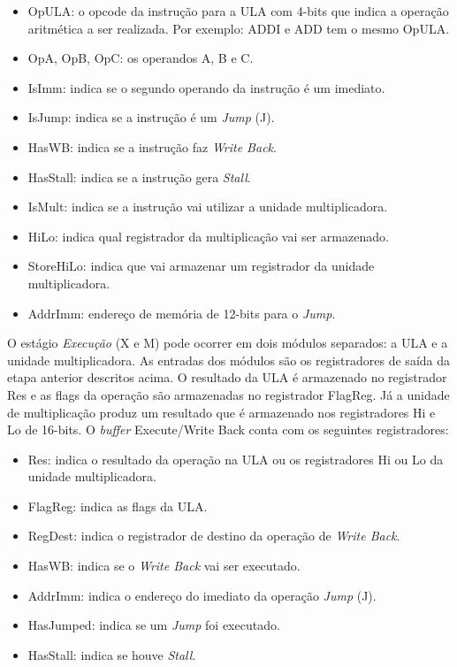 \documentclass[11pt,a4paper,titlepage]{article}
\begin{document}
\begin{itemize}
\item OpULA: o opcode da instrução para a ULA com 4-bits que indica a operação aritmética 
a ser realizada. Por exemplo: ADDI e ADD tem o mesmo OpULA.
\item OpA, OpB, OpC: os operandos A, B e C.
\item IsImm: indica se o segundo operando da instrução é um imediato.
\item IsJump: indica se a instrução é um \textit{Jump} (J).
\item HasWB: indica se a instrução faz \textit{Write Back}.
\item HasStall: indica se a instrução gera \textit{Stall}.
\item IsMult: indica se a instrução vai utilizar a unidade multiplicadora.
\item HiLo: indica qual registrador da multiplicação vai ser armazenado.
\item StoreHiLo: indica que vai armazenar um registrador da unidade multiplicadora.
\item AddrImm: endereço de memória de 12-bits para o \textit{Jump}.
\end{itemize}

O estágio \textit{Execução} (X e M) pode ocorrer em dois módulos separados: a ULA e a unidade
multiplicadora. As entradas dos módulos são os registradores de saída da etapa anterior
descritos acima. O resultado da ULA é armazenado no registrador Res e as flags da operação
são armazenadas no registrador FlagReg. Já a unidade de multiplicação produz um resultado
que é armazenado nos registradores Hi e Lo de 16-bits. O \textit{buffer} Execute/Write Back
conta com os seguintes registradores:

\begin{itemize}
\item Res: indica o resultado da operação na ULA ou os registradores Hi ou Lo da unidade multiplicadora.
\item FlagReg: indica as flags da ULA.
\item RegDest: indica o registrador de destino da operação de \textit{Write Back}.
\item HasWB: indica se o \textit{Write Back} vai ser executado.
\item AddrImm: indica o endereço do imediato da operação \textit{Jump} (J).
\item HasJumped: indica se um \textit{Jump} foi executado.
\item HasStall: indica se houve \textit{Stall}.
\end{itemize}
\end{document}
